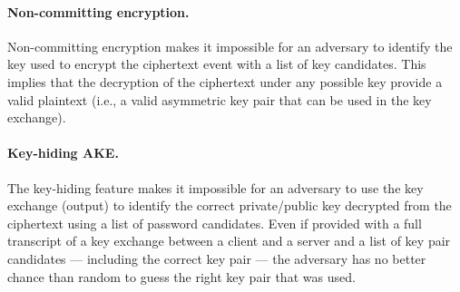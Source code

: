 ﻿\documentclass[../report.tex]{subfiles}
\begin{document}
\paragraph{Non-committing encryption.} \label{sec:non_committing_encryption}
Non-committing encryption makes it impossible for an adversary to identify the key used to encrypt the ciphertext event with a list of key candidates. This implies that the decryption of the ciphertext under any possible key provide a valid plaintext (i.e., a valid asymmetric key pair that can be used in the key exchange).
\paragraph{Key-hiding AKE.} \label{sec:key_hiding_ake}
The key-hiding feature makes it impossible for an adversary to use the key exchange (output) to identify the correct private/public key decrypted from the ciphertext using a list of password candidates.
Even if provided with a full transcript of a key exchange between a client and a server and a list of key pair candidates --- including the correct key pair --- the adversary has no better chance than random to guess the right key pair that was used.

% 
% 
\end{document}
